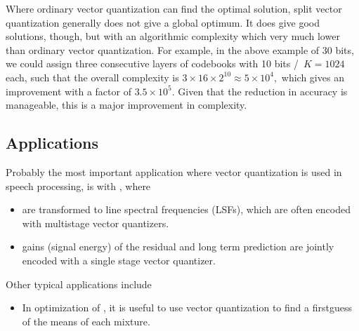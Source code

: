 \documentclass[letterpaper,10pt,english]{jupyterBook}
\begin{document}
\sphinxAtStartPar
Where ordinary vector quantization can find the optimal solution, split
vector quantization generally does not give a global optimum. It does
give good solutions, though, but with an algorithmic complexity which
very much lower than ordinary vector quantization. For example, in the
above example of 30 bits, we could assign three consecutive layers of
codebooks with 10 bits / \(K=1024\) each, such that the overall complexity
is \( 3\times 16\times 2^{10} \approx 5\times10^4, \) which gives
an improvement with a factor of \( 3.5\times10^5. \) Given that the
reduction in accuracy is manageable, this is a major improvement in
complexity.


\subsection{Applications}
\label{\detokenize{Modelling/Vector_quantization_VQ:applications}}
\sphinxAtStartPar
Probably the most important application where vector quantization is
used in speech processing, is  with , where
\begin{itemize}
\item {} 
\sphinxAtStartPar
{} are
transformed to line spectral frequencies (LSFs), which are often
encoded with multi\sphinxhyphen{}stage vector quantizers.

\item {} 
\sphinxAtStartPar
gains (signal energy) of the residual and long term prediction are
jointly encoded with a single stage vector quantizer.

\end{itemize}

\sphinxAtStartPar
Other typical applications include
\begin{itemize}
\item {} 
\sphinxAtStartPar
In optimization of , it is useful to use vector
quantization to find a first\sphinxhyphen{}guess of the means of each mixture.

\end{itemize}
\end{document}
